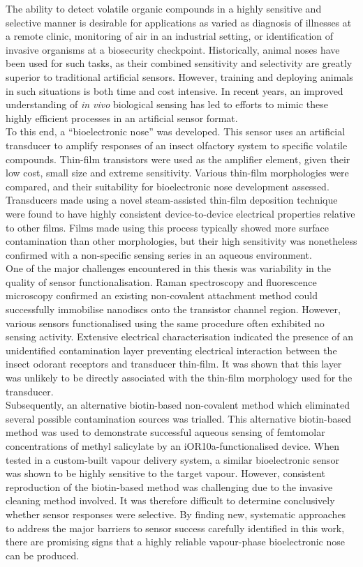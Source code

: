 \documentclass[
  a4paper,
]{scrbook}
\begin{document}
The ability to detect volatile organic compounds in a highly sensitive and selective manner is desirable for applications as varied as diagnosis of illnesses at a remote clinic, monitoring of air in an industrial setting, or identification of invasive organisms at a biosecurity checkpoint. Historically, animal noses have been used for such tasks, as their combined sensitivity and selectivity are greatly superior to traditional artificial sensors. However, training and deploying animals in such situations is both time and cost intensive. In recent years, an improved understanding of \textit{in vivo} biological sensing has led to efforts to mimic these highly efficient processes in an artificial sensor format. \\[5pt] To this end, a “bioelectronic nose” was developed. This sensor uses an artificial transducer to amplify responses of an insect olfactory system to specific volatile compounds. Thin-film transistors were used as the amplifier element, given their low cost, small size and extreme sensitivity. Various thin-film morphologies were compared, and their suitability for bioelectronic nose development assessed. Transducers made using a novel steam-assisted thin-film deposition technique were found to have highly consistent device-to-device electrical properties relative to other films. Films made using this process typically showed more surface contamination than other morphologies, but their high sensitivity was nonetheless confirmed with a non-specific sensing series in an aqueous environment. \\[5pt] One of the major challenges encountered in this thesis was variability in the quality of sensor functionalisation. Raman spectroscopy and fluorescence microscopy confirmed an existing non-covalent attachment method could successfully immobilise nanodiscs onto the transistor channel region. However, various sensors functionalised using the same procedure often exhibited no sensing activity. Extensive electrical characterisation indicated the presence of an unidentified contamination layer preventing electrical interaction between the insect odorant receptors and transducer thin-film. It was shown that this layer was unlikely to be directly associated with the thin-film morphology used for the transducer. \\[5pt] Subsequently, an alternative biotin-based non-covalent method which eliminated several possible contamination sources was trialled. This alternative biotin-based method was used to demonstrate successful aqueous sensing of femtomolar concentrations of methyl salicylate by an iOR10a-functionalised device. When tested in a custom-built vapour delivery system, a similar bioelectronic sensor was shown to be highly sensitive to the target vapour. However, consistent reproduction of the biotin-based method was challenging due to the invasive cleaning method involved. It was therefore difficult to determine conclusively whether sensor responses were selective. By finding new, systematic approaches to address the major barriers to sensor success carefully identified in this work, there are promising signs that a highly reliable vapour-phase bioelectronic nose can be produced.
\end{document}
